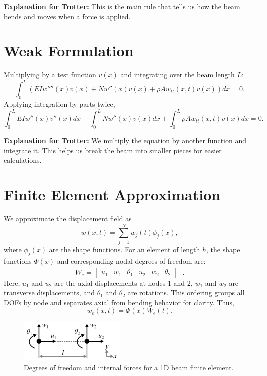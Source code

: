 \documentclass{article}
\begin{document}
	\textbf{Explanation for Trotter:} This is the main rule that tells us how the beam bends and moves when a force is applied.
	
	\section*{Weak Formulation}
	
	Multiplying by a test function $v(x)$ and integrating over the beam length $L$:
	\begin{equation}
		\int_0^L \left( EI w''''(x) v(x) + N w''(x) v(x) + \rho A w_{tt}(x, t) v(x) \right) dx = 0.
	\end{equation}
	Applying integration by parts twice,
	\begin{equation}
		\int_0^L EI w''(x) v''(x) dx + \int_0^L N w''(x) v(x) dx + \int_0^L \rho A w_{tt}(x, t) v(x) dx = 0.
	\end{equation}
	
	\textbf{Explanation for Trotter:} We multiply the equation by another function and integrate it. This helps us break the beam into smaller pieces for easier calculations.

	
	\section*{Finite Element Approximation}
	
	We approximate the displacement field as
	\begin{equation}
		w(x,t) = \sum_{j=1}^{N} w_j(t) \phi_j(x),
	\end{equation}
	where $\phi_j(x)$ are the shape functions.
	For an element of length $h$, the shape functions $\Phi(x)$ and corresponding nodal degrees of freedom are:
	\begin{equation}
		W_e = \begin{bmatrix} u_1 & w_1 & \theta_1 & u_2 & w_2 & \theta_2 \end{bmatrix}^{\intercal}.
	\end{equation}
	Here, \( u_1 \) and \( u_2 \) are the axial displacements at nodes 1 and 2, \( w_1 \) and \( w_2 \) are transverse displacements, and \( \theta_1 \) and \( \theta_2 \) are rotations. This ordering groups all DOFs by node and separates axial from bending behavior for clarity. Thus,
	\begin{equation}
		w_e(x, t) = \Phi(x) W_e(t).
	\end{equation}

	\begin{figure} [H]
		\centering
		\includegraphics[width=2.0in]{Figures/1dElementDOFs_Figure.png}
		\caption[DOFs] 
		{ \label{fig:DOFs}
			Degrees of freedom and internal forces for a 1D beam finite element. } 
		\end{figure} 
	
\end{document}
